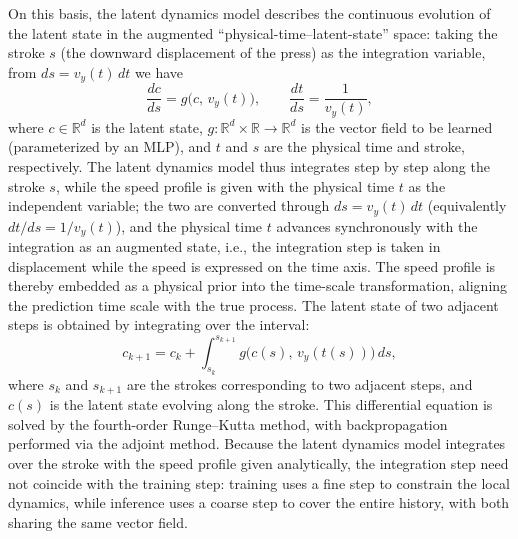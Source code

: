 On this basis, the latent dynamics model describes the continuous evolution of the latent state in the augmented ``physical-time--latent-state'' space: taking the stroke $s$ (the downward displacement of the press) as the integration variable, from $ds=v_y(t)\,dt$ we have
\begin{equation}
\frac{dc}{ds}=g\big(c,\,v_y(t)\big),\qquad \frac{dt}{ds}=\frac{1}{v_y(t)} ,
\end{equation}
where $c\in\mathbb{R}^{d}$ is the latent state, $g:\mathbb{R}^{d}\times\mathbb{R}\to\mathbb{R}^{d}$ is the vector field to be learned (parameterized by an MLP), and $t$ and $s$ are the physical time and stroke, respectively. The latent dynamics model thus integrates step by step along the stroke $s$, while the speed profile is given with the physical time $t$ as the independent variable; the two are converted through $ds=v_y(t)\,dt$ (equivalently $dt/ds=1/v_y(t)$), and the physical time $t$ advances synchronously with the integration as an augmented state, i.e., the integration step is taken in displacement while the speed is expressed on the time axis. The speed profile is thereby embedded as a physical prior into the time-scale transformation, aligning the prediction time scale with the true process. The latent state of two adjacent steps is obtained by integrating over the interval:
\begin{equation}
c_{k+1}=c_k+\int_{s_k}^{s_{k+1}} g\big(c(s),\,v_y(t(s))\big)\,ds ,
\end{equation}
where $s_k$ and $s_{k+1}$ are the strokes corresponding to two adjacent steps, and $c(s)$ is the latent state evolving along the stroke. This differential equation is solved by the fourth-order Runge--Kutta method, with backpropagation performed via the adjoint method. Because the latent dynamics model integrates over the stroke with the speed profile given analytically, the integration step need not coincide with the training step: training uses a fine step to constrain the local dynamics, while inference uses a coarse step to cover the entire history, with both sharing the same vector field.

